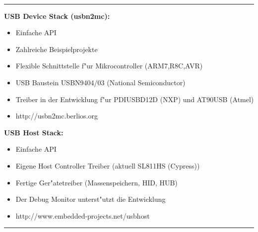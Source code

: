 \documentclass[11pt]{article}
\begin{document}
\begin{minipage}[t]{7cm}
\hfill {\Large{}}\\
\hrule

\newline
\textbf{USB Device Stack (usbn2mc):}
\begin{itemize}
\item Einfache API
\item Zahlreiche Beispielprojekte
\item Flexible Schnittstelle f"ur Mikrocontroller (ARM7,R8C,AVR) 
\item USB Baustein USBN9404/03 (National Semiconductor)
\item Treiber in der Entwicklung f"ur PDIUSBD12D (NXP) und AT90USB (Atmel)
\item http://usbn2mc.berlios.org
\end{itemize}

\textbf{USB Host Stack:}
\begin{itemize}
\item Einfache API
\item Eigene Host Controller Treiber (aktuell SL811HS (Cypress))
\item Fertige Ger"atetreiber (Massenspeichern, HID, HUB)
\item Der Debug Monitor unterst"utzt die Entwicklung
\item http://www.embedded-projects.net/usbhost
\end{itemize}

\vskip 5mm

\end{minipage}
\hskip 12mm
\rule[-18.8cm]{0.2pt}{5mm}  %
\hskip 12mm
\end{document}
